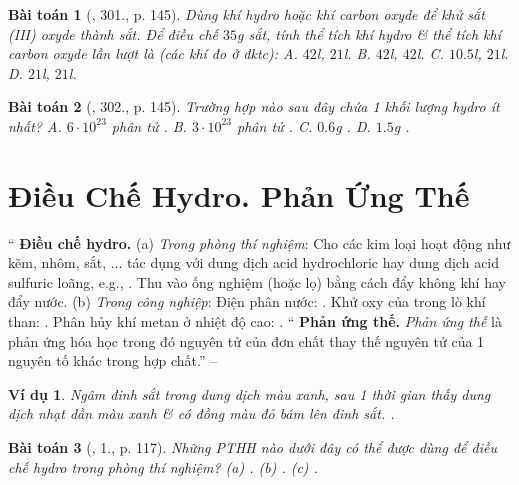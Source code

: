 \documentclass{article}
\newtheorem{baitoan}{Bài toán}
\newtheorem{vidu}{Ví dụ}
\begin{document}
\begin{baitoan}[\cite{An_400_BT_Hoa_Hoc_8_2020}, 301., p. 145]
	Dùng khí hydro hoặc khí carbon oxyde để khử sắt (III) oxyde thành sắt. Để điều chế $35$\emph{g} sắt, tính thể tích khí hydro \& thể tích khí carbon oxyde lần lượt là (các khí đo ở đktc): {\sf A.} $42$\emph{l}, $21$\emph{l}. {\sf B.} $42$\emph{l}, $42$\emph{l}. {\sf C.} $10.5$\emph{l}, $21$\emph{l}. {\sf D.} $21$\emph{l}, $21$\emph{l}.
\end{baitoan}

\begin{baitoan}[\cite{An_400_BT_Hoa_Hoc_8_2020}, 302., p. 145]
	Trường hợp nào sau đây chứa 1 khối lượng hydro ít nhất? {\sf A.} $6\cdot10^{23}$ phân tử \emph{}. {\sf B.} $3\cdot10^{23}$ phân tử \emph{}. {\sf C.} $0.6$\emph{g} \emph{}. {\sf D.} $1.5$\emph{g} \emph{}.
\end{baitoan}


\section{Điều Chế Hydro. Phản Ứng Thế}
`` \textsf{\textbf{Điều chế hydro.}} (a) \textit{Trong phòng thí nghiệm}: Cho các kim loại hoạt động như kẽm, nhôm, sắt, $\ldots$ tác dụng với dung dịch acid hydrochloric hay dung dịch acid sulfuric loãng, e.g., . Thu  vào ống nghiệm (hoặc lọ) bằng cách đẩy không khí hay đẩy nước. (b) \textit{Trong công nghiệp}: Điện phân nước: . Khử oxy của  trong lò khí than: . Phân hủy khí metan ở nhiệt độ cao: . `` \textsf{\textbf{Phản ứng thế.}} \textit{Phản ứng thế} là phản ứng hóa học trong đó nguyên tử của đơn chất thay thế nguyên tử của 1 nguyên tố khác trong hợp chất.'' -- \cite[Chap. 5, \S3, pp. 82--83]{Truong_BTNC_Hoa_Hoc_8_2022}

\begin{vidu}
	Ngâm đinh sắt trong dung dịch \emph{} màu xanh, sau 1 thời gian thấy dung dịch nhạt dần màu xanh \& có đồng màu đỏ bám lên đinh sắt. \emph{}.
\end{vidu}

\begin{baitoan}[\cite{SGK_Hoa_Hoc_8}, 1., p. 117]
	Những PTHH nào dưới đây có thể được dùng để điều chế hydro trong phòng thí nghiệm? (a) \emph{}. (b) \emph{}. (c) \emph{}.
\end{baitoan}
\end{document}
